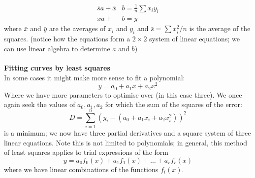 \documentclass{report}
\begin{document}
\begin{align*}
\bar{s}a+\bar{x}&b=\frac{1}{n}\sum x_iy_i\\
\bar{x}a+&b=\bar{y}
\end{align*}
where $\bar{x}$ and $\bar{y}$ are the averages of $x_i$ and $y_i$ and $\bar{s}=\sum x_i^2/n$ is the average 
of the squares. (notice how the equations form a $2\times2$ system of linear equations; we can use linear algebra
to determine $a$ and $b$)\\
\vspace{1mm}\\
\textbf{Fitting curves by least squares}\\
In some cases it might make more sense to fit a polynomial:\begin{equation*}
y=a_0+a_1x+a_2x^2
\end{equation*}
Where we have more parameters to optimise over (in this case three). We once again seek the values of 
$a_0,a_1,a_2$ for which the sum of the squares of the error:
\begin{equation*}
D=\sum^n_{i=1}(y_i-(a_0+a_1x_i+a_2x_i^2))^2
\end{equation*}
is a minimum; we now have three partial derivatives and a square system of three linear equations.
Note this is not limited to polynomials; in general, this method of least squares applies to 
trial expressions of the form
\begin{equation*}
y=a_0f_0(x)+a_1f_1(x)+\ldots+a_rf_r(x)
\end{equation*}
where we have linear combinations of the functions $f_i(x)$.
\newpage
\end{document}
